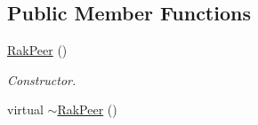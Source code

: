 \subsection*{Public Member Functions}
\begin{DoxyCompactItemize}
\item 
\hypertarget{class_rak_net_1_1_rak_peer_aac8368908e13e92fb7a2e080c7aa01a7}{\hyperlink{class_rak_net_1_1_rak_peer_aac8368908e13e92fb7a2e080c7aa01a7}{Rak\-Peer} ()}\label{class_rak_net_1_1_rak_peer_aac8368908e13e92fb7a2e080c7aa01a7}

\begin{DoxyCompactList}\small\item\em Constructor. \end{DoxyCompactList}\item 
\hypertarget{class_rak_net_1_1_rak_peer_aed5b944fb045c704771af32b314c2f14}{virtual \hyperlink{class_rak_net_1_1_rak_peer_aed5b944fb045c704771af32b314c2f14}{$\sim$\-Rak\-Peer} ()}\label{class_rak_net_1_1_rak_peer_aed5b944fb045c704771af32b314c2f14}


\end{DoxyCompactItemize}
